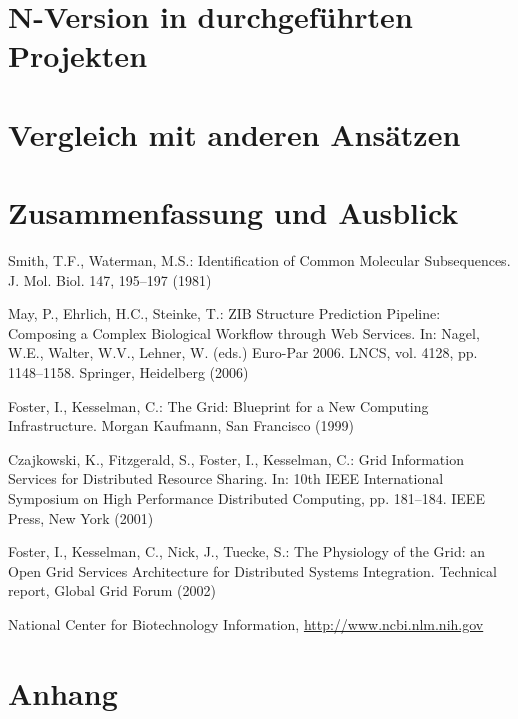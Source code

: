 \documentclass[runningheads,a4paper]{llncs}
\begin{document}
\section{N-Version in durchgeführten Projekten} \label{beispiele}


\section{Vergleich mit anderen Ansätzen} \label{bewertung}


\section{Zusammenfassung und Ausblick} \label{zusammenfassung-ausblick}





\begin{thebibliography}{4}

 Smith, T.F., Waterman, M.S.: Identification of Common Molecular
Subsequences. J. Mol. Biol. 147, 195--197 (1981)

 May, P., Ehrlich, H.C., Steinke, T.: ZIB Structure Prediction Pipeline:
Composing a Complex Biological Workflow through Web Services. In: Nagel,
W.E., Walter, W.V., Lehner, W. (eds.) Euro-Par 2006. LNCS, vol. 4128,
pp. 1148--1158. Springer, Heidelberg (2006)

 Foster, I., Kesselman, C.: The Grid: Blueprint for a New Computing
Infrastructure. Morgan Kaufmann, San Francisco (1999)

 Czajkowski, K., Fitzgerald, S., Foster, I., Kesselman, C.: Grid
Information Services for Distributed Resource Sharing. In: 10th IEEE
International Symposium on High Performance Distributed Computing, pp.
181--184. IEEE Press, New York (2001)

 Foster, I., Kesselman, C., Nick, J., Tuecke, S.: The Physiology of the
Grid: an Open Grid Services Architecture for Distributed Systems
Integration. Technical report, Global Grid Forum (2002)

 National Center for Biotechnology Information, \url{http://www.ncbi.nlm.nih.gov}

\end{thebibliography}


\section*{Anhang}

\end{document}
